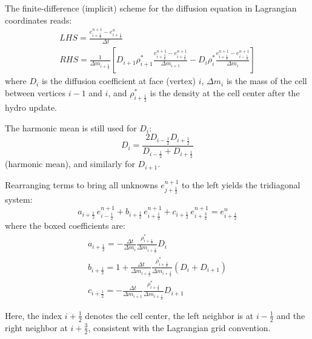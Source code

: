 \documentclass[11pt]{article}
\begin{document}
\begin{enumerate}
  The finite-difference (implicit) scheme for the diffusion equation in Lagrangian coordinates reads:
  \begin{equation}
    \begin{gathered}
    LHS = \frac{e_{i+\frac{1}{2}}^{n+1} - e_{i+\frac{1}{2}}^n}{\Delta t} \\
    RHS = \frac{1}{\Delta m_{i+\frac{1}{2}}}
      \left[
        D_{i+1} \rho_{i+1}^* \frac{e_{i+\frac{3}{2}}^{n+1} - e_{i+\frac{1}{2}}^{n+1}}{\Delta m_{i+1}}
        - D_{i} \rho_{i}^* \frac{e_{i+\frac{1}{2}}^{n+1} - e_{i-\frac{1}{2}}^{n+1}}{\Delta m_{i}}
      \right]
    \end{gathered}
  \end{equation}
  where $D_i$ is the diffusion coefficient at face (vertex) $i$, $\Delta m_{i}$ is the mass of the cell between vertices $i-1$ and $i$, and $\rho_{i+\frac{1}{2}}^*$ is the density at the cell center after the hydro update.

  The harmonic mean is still used for $D_i$:
  \begin{equation}
    D_{i} = \frac{2 D_{i-\frac{1}{2}} D_{i+\frac{1}{2}}}{D_{i-\frac{1}{2}} + D_{i+\frac{1}{2}}}
  \end{equation}
  (harmonic mean), and similarly for $D_{i+1}$.

  Rearranging terms to bring all unknowns $e_{j+\frac{1}{2}}^{n+1}$ to the left yields the tridiagonal system:
  \begin{equation}
    \boxed{
      a_{i+\frac{1}{2}}\, e_{i-\frac{1}{2}}^{n+1}
      + b_{i+\frac{1}{2}}\, e_{i+\frac{1}{2}}^{n+1}
      + c_{i+\frac{1}{2}}\, e_{i+\frac{3}{2}}^{n+1}
      = e_{i+\frac{1}{2}}^n
    }
  \end{equation}
  where the boxed coefficients are:
  \begin{gather}
    \boxed{
      a_{i+\frac{1}{2}} = -\frac{\Delta t}{\Delta m_{i}} \frac{\rho_{i+\frac{1}{2}}^*}{\Delta m_{i+\frac{1}{2}}} D_{i}
    } \\[1em]
    \boxed{
      b_{i+\frac{1}{2}} = 1 + \frac{\Delta t}{\Delta m_{i+\frac{1}{2}}} \frac{\rho_{i+\frac{1}{2}}^*}{\Delta m_{i+\frac{1}{2}}} ( D_{i} + D_{i+1} )
    } \\[1em]
    \boxed{
      c_{i+\frac{1}{2}} = -\frac{\Delta t}{\Delta m_{i+1}} \frac{\rho_{i+\frac{1}{2}}^*}{\Delta m_{i+\frac{1}{2}}} D_{i+1}
    }
  \end{gather}

  Here, the index $i+\frac{1}{2}$ denotes the cell center, the left neighbor is at $i-\frac{1}{2}$ and the right neighbor at $i+\frac{3}{2}$, consistent with the Lagrangian grid convention.


\end{enumerate}
\end{document}
